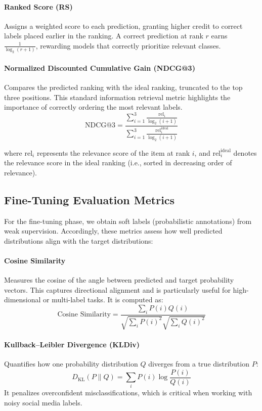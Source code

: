 \paragraph{Ranked Score (RS)}  
Assigns a weighted score to each prediction, granting higher credit to correct labels placed earlier in the ranking. A correct prediction at rank $r$ earns \( \frac{1}{\log_2(r+1)} \), rewarding models that correctly prioritize relevant classes.

\paragraph{Normalized Discounted Cumulative Gain (NDCG@3)}  
Compares the predicted ranking with the ideal ranking, truncated to the top three positions. This standard information retrieval metric highlights the importance of correctly ordering the most relevant labels.
\begin{equation}
\text{NDCG@3} = \frac{\sum_{i=1}^{3} \frac{\text{rel}_i}{\log_2(i+1)}}{\sum_{i=1}^{3} \frac{\text{rel}_i^{\text{ideal}}}{\log_2(i+1)}}
\end{equation}

where $\text{rel}_i$ represents the relevance score of the item at rank $i$, and $\text{rel}_i^{\text{ideal}}$ denotes the relevance score in the ideal ranking (i.e., sorted in decreasing order of relevance).

\subsection{Fine-Tuning Evaluation Metrics}

For the fine-tuning phase, we obtain soft labels (probabilistic annotations) from weak supervision. Accordingly, these metrics assess how well predicted distributions align with the target distributions:

\paragraph{Cosine Similarity}  
Measures the cosine of the angle between predicted and target probability vectors. This captures directional alignment and is particularly useful for high-dimensional or multi-label tasks. It is computed as:
\begin{equation}
    \text{Cosine Similarity} = \frac{\sum_{i} P(i) Q(i)}{\sqrt{\sum_{i} P(i)^2} \sqrt{\sum_{i} Q(i)^2}}
\end{equation}

\paragraph{Kullback--Leibler Divergence (KLDiv)}  
Quantifies how one probability distribution $Q$ diverges from a true distribution $P$:
\begin{equation}
    D_{\mathrm{KL}}(P \parallel Q) = \sum_{i} P(i) \log \frac{P(i)}{Q(i)}
\end{equation}
It penalizes overconfident misclassifications, which is critical when working with noisy social media labels.

